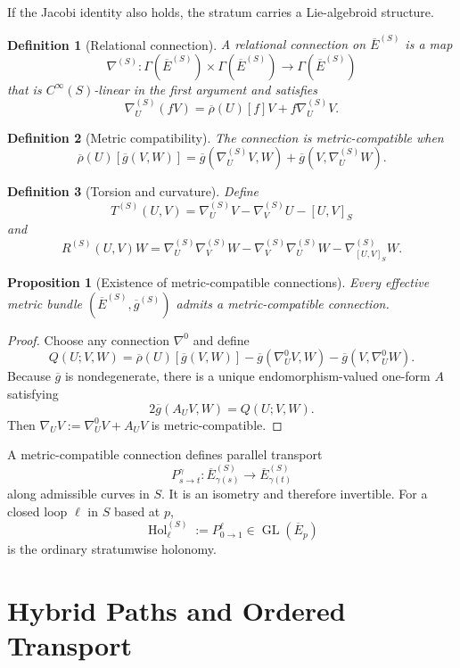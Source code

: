 \documentclass[11pt]{article}
\newtheorem{definition}{Definition}[section]
\newtheorem{proposition}{Proposition}[section]
\newcommand{\Hol}{\operatorname{Hol}}
\newcommand{\GL}{\operatorname{GL}}
\begin{document}
If the Jacobi identity also holds, the stratum carries a Lie-algebroid
structure.

\begin{definition}[Relational connection]
A relational connection on $\overline E^{(S)}$ is a map
\[
\nabla^{(S)}:\Gamma(\overline E^{(S)})\times
\Gamma(\overline E^{(S)})\to\Gamma(\overline E^{(S)})
\]
that is $C^\infty(S)$-linear in the first argument and satisfies
\[
\nabla^{(S)}_U(fV)=\overline\rho(U)[f]V+f\nabla^{(S)}_UV.
\]
\end{definition}

\begin{definition}[Metric compatibility]
The connection is metric-compatible when
\[
\overline\rho(U)[\overline g(V,W)]
=\overline g(\nabla^{(S)}_UV,W)
+\overline g(V,\nabla^{(S)}_UW).
\]
\end{definition}

\begin{definition}[Torsion and curvature]
Define
\[
T^{(S)}(U,V)=\nabla^{(S)}_UV-\nabla^{(S)}_VU-[U,V]_S
\]
and
\[
R^{(S)}(U,V)W
=\nabla^{(S)}_U\nabla^{(S)}_VW
-\nabla^{(S)}_V\nabla^{(S)}_UW
-\nabla^{(S)}_{[U,V]_S}W.
\]
\end{definition}

\begin{proposition}[Existence of metric-compatible connections]
Every effective metric bundle $(\overline E^{(S)},\overline g^{(S)})$ admits a
metric-compatible connection.
\end{proposition}

\begin{proof}
Choose any connection $\nabla^0$ and define
\[
Q(U;V,W)=\overline\rho(U)[\overline g(V,W)]
-\overline g(\nabla^0_UV,W)-\overline g(V,\nabla^0_UW).
\]
Because $\overline g$ is nondegenerate, there is a unique endomorphism-valued
one-form $A$ satisfying
\[
2\overline g(A_UV,W)=Q(U;V,W).
\]
Then $\nabla_UV:=\nabla^0_UV+A_UV$ is metric-compatible.
\end{proof}

A metric-compatible connection defines parallel transport
\[
P^\gamma_{s\to t}:\overline E^{(S)}_{\gamma(s)}
\to\overline E^{(S)}_{\gamma(t)}
\]
along admissible curves in $S$. It is an isometry and therefore invertible.
For a closed loop $\ell$ in $S$ based at $p$,
\[
\Hol^{(S)}_\ell:=P^\ell_{0\to1}\in\GL(\overline E_p)
\]
is the ordinary stratumwise holonomy.

\section{Hybrid Paths and Ordered Transport}
\label{sec:hybrid}
\end{document}
